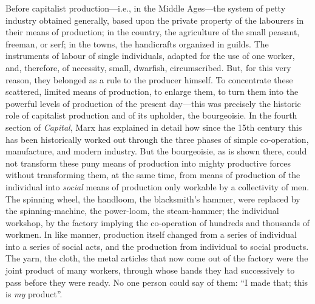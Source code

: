 Before capitalist production---i.e., in the Middle Ages---the system of petty
industry obtained generally, based upon the private property of the labourers in
their means of production; in the country, the agriculture of the small peasant,
freeman, or serf; in the towns, the handicrafts organized in guilds. The
instruments of labour of single individuals, adapted for the use of one worker,
and, therefore, of necessity, small, dwarfish, circumscribed. But, for this very
reason, they belonged as a rule to the producer himself. To concentrate these
scattered, limited means of production, to enlarge them, to turn them into the
powerful levels of production of the present day---this was precisely the
historic role of capitalist production and of its upholder, the bourgeoisie. In
the fourth section of \emph{Capital}, Marx has explained in detail how since the
15th century this has been historically worked out through the three phases of
simple co-operation, manufacture, and modern industry. But the bourgeoisie, as
is shown there, could not transform these puny means of production into mighty
productive forces without transforming them, at the same time, from means of
production of the individual into \emph{social} means of production only
workable by a collectivity of men. The spinning wheel, the handloom, the
blacksmith's hammer, were replaced by the spinning-machine, the power-loom, the
steam-hammer; the individual workshop, by the factory implying the co-operation
of hundreds and thousands of workmen. In like manner, production itself changed
from a series of individual into a series of social acts, and the production
from individual to social products. The yarn, the cloth, the metal articles that
now come out of the factory were the joint product of many workers, through
whose hands they had successively to pass before they were ready. No one person
could say of them: ``I made that; this is \emph{my} product''.

